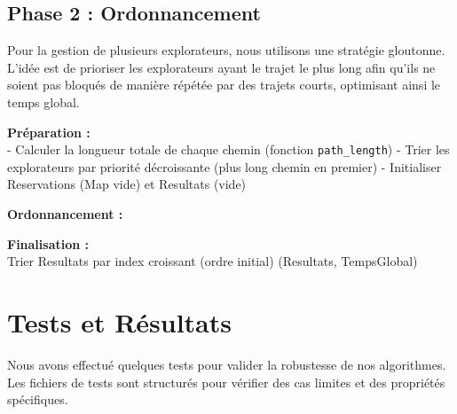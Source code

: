 \documentclass[a4paper,11pt]{article}
\begin{document}
\subsection{Phase 2 : Ordonnancement}
Pour la gestion de plusieurs explorateurs, nous utilisons une stratégie gloutonne. 
L'idée est de prioriser les explorateurs ayant le trajet le plus long afin qu'ils ne soient pas bloqués
 de manière répétée par des trajets courts, optimisant ainsi le temps global.

\begin{algorithm}[H]
\SetAlgoLined
{}

 \textbf{Préparation :}\\
 - Calculer la longueur totale de chaque chemin (fonction \texttt{path\_length})\;
 - Trier les explorateurs par priorité décroissante (plus long chemin en premier)\;
 - Initialiser Reservations (Map vide) et Resultats (vide)\;
 
 \textbf{Ordonnancement :}\\
 
 \textbf{Finalisation :}\\
 Trier Resultats par index croissant (ordre initial)\;
 \Return (Resultats, TempsGlobal)\;
 
 \caption{Algorithme d'Ordonnancement (Phase 2)}
\end{algorithm}

\section{Tests et Résultats}

Nous avons effectué quelques tests pour valider la robustesse de nos algorithmes. Les fichiers de tests sont structurés pour vérifier des cas limites et des propriétés spécifiques.
\end{document}
